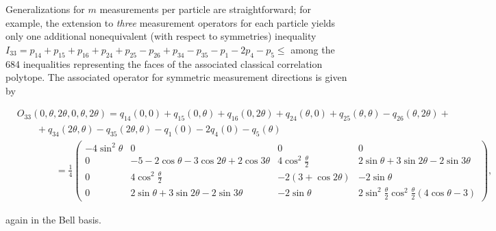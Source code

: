 \documentclass[prl,showpacs,showkeys,amsfonts,amsmath,twocolumn]{revtex4}
\newcommand{\ket}[1]{|#1\rangle}
\begin{document}
Generalizations for $m$ measurements per particle are
straightforward;
for example, the extension to \emph{three} measurement operators for each particle
yields only one additional nonequivalent (with respect to symmetries)
inequality \cite{collins-gisin-2003,sliwa-2003}
$I_{33}=p_{14} + p_{15} + p_{16} + p_{24} + p_{25} - p_{26} + p_{34} - p_{35}
- p_{1} - 2 p_{4} - p_{5} \leq$ among the 684 inequalities \cite{2000-poly} representing the
 faces of the associated classical correlation polytope.
The associated operator for symmetric
measurement directions is given by
\begin{widetext}
\begin{equation}
\begin{array}{lll}
&O_{33}(0,\theta,2\theta,0,\theta,2\theta)= q_{14}(0,0) + q_{15}(0,\theta) + q_{16}(0,2\theta) + q_{24}(\theta,0) +
q_{25}(\theta,\theta) - q_{26}(\theta,2\theta) +\\
&\qquad  + q_{34}(2\theta,\theta)- q_{35}(2\theta,\theta)-q_{1}(0) - 2 q_{4}(0) - q_{5}(\theta) \\
&\qquad \qquad =\frac{1}{4}\left(
\begin{smallmatrix}
-4\sin^2\theta & 0 & 0 & 0\\
0 & -5-2\cos\theta - 3\cos 2\theta + 2\cos 3\theta &
4\cos^2\frac{\theta}{2} & 2\sin\theta + 3 \sin 2\theta - 2 \sin
3\theta\\
0 & 4\cos^2\frac{\theta}{2} & -2(3+\cos 2\theta) & - 2\sin\theta \\
0 &  2\sin\theta + 3 \sin 2\theta - 2 \sin 3\theta & - 2\sin\theta &
2\sin^2\frac{\theta}{2}\cos^2\frac{\theta}{2}(4\cos\theta -3)
\end{smallmatrix}\right),
\end{array}
\label{2004-qbounds-e5}
\end{equation}
\end{widetext}
again in the Bell basis.
\end{document}
